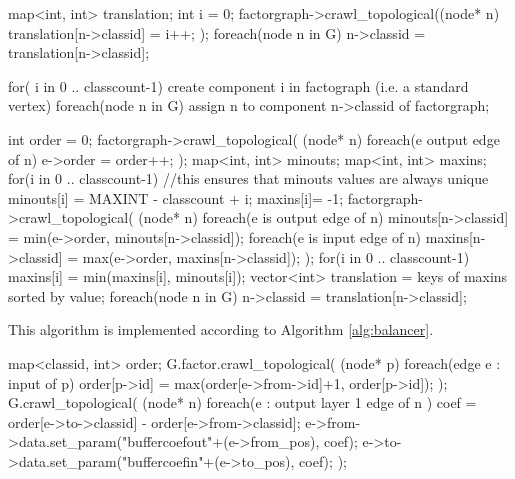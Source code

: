 \mybeginfigloose
\begin{code}
map<int, int> translation;
int i = 0;
factorgraph->crawl_topological((node* n){
  translation[n->classid] = i++;
});
foreach(node n in G)
  n->classid = translation[n->classid];
\end{code}

\mybeginfigloose
\begin{code}
for( i in 0 .. classcount-1)
  create component i in factograph (i.e. a standard vertex)
foreach(node n in G)
  assign n to component n->classid of factorgraph;
\end{code}
 
\mybeginfigloose
\begin{code}
int order = 0;
factorgraph->crawl_topological(
  (node* n){ 
    foreach(e output edge of n) 
      e->order = order++;
  }
);
map<int, int> minouts;
map<int, int> maxins;
for(i in 0 .. classcount-1) 
{
  //this ensures that minouts values are always unique
  minouts[i] = MAXINT - classcount + i;
  maxins[i]= -1;
} 
factorgraph->crawl_topological(
  (node* n){
    foreach(e is output edge of n)
      minouts[n->classid] = min(e->order, minouts[n->classid]);
    foreach(e is input edge of n)
      maxins[n->classid] = max(e->order, maxins[n->classid]);
  }
); 
for(i in 0 .. classcount-1)
  maxins[i] = min(maxins[i], minouts[i]);
vector<int> translation = keys of maxins sorted by value;
foreach(node n in G)
  n->classid = translation[n->classid];
\end{code}


\FloatBarrier


This algorithm is implemented according to Algorithm \ref{alg:balancer}. 

\mybeginfig
\begin{code}
map<classid, int> order;
G.factor.crawl_topological(
  (node* p){
    foreach(edge e : input of p)
      order[p->id] = max(order[e->from->id]+1, order[p->id]);
  }
);
G.crawl_topological(
  (node* n){
    foreach(e : output layer 1 edge of n ) {
      coef = order[e->to->classid] - order[e->from->classid];
      e->from->data.set_param("buffercoefout"+(e->from_pos), coef);
      e->to->data.set_param("buffercoefin"+(e->to_pos), coef);
    }
  }
);
\end{code}

